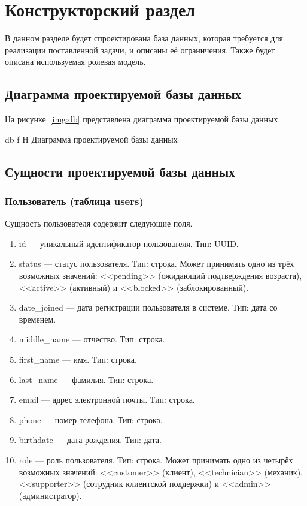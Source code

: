 \chapter{Конструкторский раздел}

В данном разделе будет спроектирована база данных, которая требуется для реализации поставленной задачи, и описаны её ограничения. Также будет описана используемая ролевая модель.

\section{Диаграмма проектируемой базы данных}

На рисунке~\ref{img:db} представлена диаграмма проектируемой базы данных.

    {db}
    {f}
    {H}
    {\textwidth}
    {Диаграмма проектируемой базы данных}

\section{Сущности проектируемой базы данных}

\subsection{Пользователь (таблица users)}

Сущность пользователя содержит следующие поля.

\begin{enumerate}
    \item id --- уникальный идентификатор пользователя. Тип: UUID.
    \item status --- статус пользователя. Тип: строка. Может принимать одно из трёх возможных значений: <<pending>> (ожидающий подтверждения возраста), <<active>> (активный) и <<blocked>> (заблокированный).
    \item date\_joined --- дата регистрации пользователя в системе. Тип: дата со временем.
    \item middle\_name --- отчество. Тип: строка.
    \item first\_name --- имя. Тип: строка.
    \item last\_name --- фамилия. Тип: строка.
    \item email --- адрес электронной почты. Тип: строка.
    \item phone --- номер телефона. Тип: строка.
    \item birthdate --- дата рождения. Тип: дата.
    \item role --- роль пользователя. Тип: строка. Может принимать одно из четырёх возможных значений: <<customer>> (клиент), <<technician>> (механик), <<supporter>> (сотрудник клиентской поддержки) и <<admin>> (администратор).
\end{enumerate}


